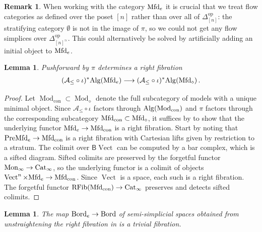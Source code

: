 \documentclass[10pt]{amsart}
\numberwithin{equation}{section}
\newtheorem{lem}[prop]{Lemma}
\theoremstyle{definition}
\newtheorem{rem}[prop]{Remark}
\DeclareMathOperator{\Mod}{Mod}
\DeclareMathOperator{\op}{op}
\DeclareMathOperator{\con}{con}
\DeclareMathOperator{\RFib}{RFib}
\DeclareMathOperator{\Vect}{Vect}
\newcommand{\PreBord}{\mathrm{Bord}\vphantom{d}}
\newcommand{\Cat}{\mathrm{Cat}\vphantom{t}}
\newcommand{\Mfd}{\mathrm{Mfd}\vphantom{d}}
\newcommand{\PreMfd}{\mathrm{PreMfd}\vphantom{d}}
\newcommand{\Alg}{\mathrm{Alg}\vphantom{z}}
\newcommand{\Simp}{\mathbb{\Delta}}
\newcommand{\cA}{\mathcal{A}}
\newcommand{\sfB}{\mathsf{B}}
\newcommand{\Mon}{\mathrm{Mon}_{\infty}}
\renewcommand{\to}{\mathchoice{\longrightarrow}{\rightarrow}{}{}}
\begin{document}
\begin{rem}
	When working with the category $\Mfd_{e}$ it is crucial that we treat flow categories as defined over the poset $[n]$ rather than over all of $\Simp^{\op}_{[n]}$: the stratifying category $\emptyset$ is not in the image of $\pi$, so we could not get any flow simplices over $\Simp^{\op}_{[n]^{\simeq}}$.
  This could alternatively be solved by artificially adding an initial object to $\Mfd_{e}$.
\end{rem}

\begin{lem}\label{lem:Mfd_e->Mfd_is_right_fib}
	Pushforward by $\pi$ determines a right fibration
	\begin{align*}
		(\cA_{\leq}\circ \iota)^{*}\Alg(\Mfd_{e}) \to (\cA_{\leq}\circ \iota)^{*}\Alg(\Mfd_{\diamond})\,.
	\end{align*}
\end{lem}

\begin{proof}
	Let $\Mod_{\con}\subset \Mod_{\diamond}$ denote the full subcategory of models with a unique minimal object.
  Since $\cA_{\leq}\circ \iota$ factors through $\Alg(\Mod_{\con})$ and $\pi$ factors through the corresponding subcategory $\Mfd_{\con}\subset \Mfd_{\diamond}$, it suffices by  to show that the underlying functor $\Mfd_{e}\to \Mfd_{\con}$ is a right fibration.
  Start by noting that $\PreMfd_{e} \to \Mfd_{\con}$ is a right fibration with Cartesian lifts given by restriction to a stratum.
  The colimit over $\sfB \Vect$ can be computed by a bar complex, which is a sifted diagram.
  Sifted colimits are preserved by the forgetful functor $\Mon \to \Cat_{\infty}$, so the underlying functor is a colimit of objects $\Vect^{n}\times \Mfd_{e} \to \Mfd_{\con}$.
  Since $\Vect$ is a space, each such is a right fibration.
  The forgetful functor $\RFib(\Mfd_{\con})\to \Cat_{\infty}$ preserves and detects sifted colimits.
\end{proof}

\begin{lem}\label{lem:Bord_e->Bord_is_trivial}
	The map $\PreBord_{e} \to \PreBord$ of semi-simplicial spaces obtained from unstraightening the right fibration in  is a trivial fibration.
\end{lem}
\end{document}
